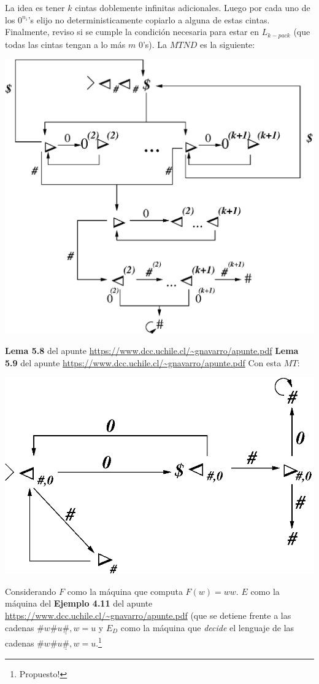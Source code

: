 \documentclass[dcc]{fcfmcourse}
\begin{document}
\begin{problems}
 \problem La idea es tener $k$ cintas doblemente infinitas adicionales. Luego por cada uno de los $0^{n_{i}}$'s elijo no deterministicamente copiarlo a alguna de estas cintas. Finalmente, reviso si se cumple la condición necesaria para estar en $L_{k-pack}$ (que todas las cintas tengan a lo más $m$ $0$'s). La $MTND$ es la siguiente:
 \begin{center}
 \includegraphics[scale=0.8]{9P12.eps}
 \end{center}
 \problem \textbf{Lema 5.8} del apunte \url{https://www.dcc.uchile.cl/~gnavarro/apunte.pdf}
 \problem \textbf{Lema 5.9} del apunte \url{https://www.dcc.uchile.cl/~gnavarro/apunte.pdf}
 \newpage
 \problem Con esta $MT$:
  \begin{center}
 \includegraphics[scale=0.5]{9P4.eps}
 \end{center}
 Considerando $F$ como la máquina que computa $F(w) = ww$. $E$ como la máquina del \textbf{Ejemplo 4.11} del apunte \url{https://www.dcc.uchile.cl/~gnavarro/apunte.pdf} (que se detiene frente a las cadenas $\#w\#u\underline{\#}, w=u$ y $E_{D}$ como la máquina que \textit{decide} el lenguaje de las cadenas $\#w\#u\underline{\#}, w=u$.\footnote{Propuesto!}\\
 

\end{problems}
\end{document}

